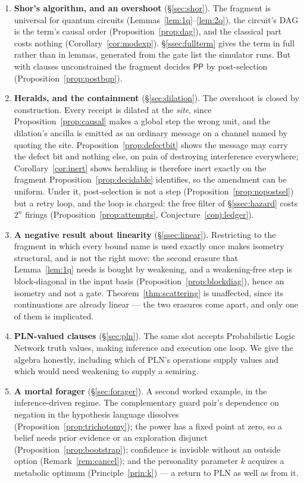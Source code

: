 \documentclass[11pt,a4paper]{article}
\theoremstyle{plain}
\theoremstyle{definition}
\theoremstyle{remark}
\begin{document}
\begin{enumerate}[leftmargin=1.4em,itemsep=3pt]
\item \textbf{Shor's algorithm, and an overshoot} (\S\ref{sec:shor}). The
fragment is universal for quantum circuits (Lemmas~\ref{lem:1q}--\ref{lem:2q}),
the circuit's DAG is the term's causal order (Proposition~\ref{prop:dag}), and
the classical part costs nothing (Corollary~\ref{cor:modexp}). \S\ref{ssec:fullterm}
gives the term in full rather than in lemmas, generated from the gate list the
simulator runs. But with clauses
unconstrained the fragment decides $\mathsf{PP}$ by post-selection
(Proposition~\ref{prop:postbqp}).

\item \textbf{Heralds, and the containment} (\S\ref{sec:dilation}). The
overshoot is closed by construction. Every receipt is dilated at the \emph{site},
since Proposition~\ref{prop:causal} makes a global step the wrong unit, and the
dilation's ancilla is emitted as an ordinary message on a channel named by
quoting the site. Proposition~\ref{prop:defectbit} shows the message may carry
the defect bit and nothing else, on pain of destroying interference everywhere;
Corollary~\ref{cor:inert} shows heralding is therefore inert exactly on the
fragment Proposition~\ref{prop:decidable} identifies, so the amendment can be
uniform. Under it, post-selection is not a step
(Proposition~\ref{prop:nopostsel}) but a retry loop, and the loop is charged:
the free filter of \S\ref{ssec:hazard} costs $2^n$ firings
(Proposition~\ref{prop:attempts}, Conjecture~\ref{conj:ledger}).

\item \textbf{A negative result about linearity} (\S\ref{ssec:linear}).
Restricting to the fragment in which every bound name is used exactly once makes
isometry structural, and is not the right move: the second erasure that
Lemma~\ref{lem:1q} needs is bought by weakening, and a weakening-free step is
block-diagonal in the input basis (Proposition~\ref{prop:blockdiag}), hence an
isometry and not a gate. Theorem~\ref{thm:scattering} is unaffected, since its
continuations are already linear --- the two erasures come apart, and only one
of them is implicated.

\item \textbf{PLN-valued clauses} (\S\ref{sec:pln}). The same slot accepts
Probabilistic Logic Network truth values, making inference and execution one
loop. We give the algebra honestly, including which of PLN's operations supply
values and which would need weakening to supply a semiring.

\item \textbf{A mortal forager} (\S\ref{sec:forager}). A second worked example,
in the inference-driven regime. The complementary guard pair's dependence on
negation in the hypothesis language dissolves
(Proposition~\ref{prop:trichotomy}); the power has a fixed point at zero, so a
belief needs prior evidence or an exploration disjunct
(Proposition~\ref{prop:bootstrap}); confidence is invisible without an outside
option (Remark~\ref{rem:cancel}); and the personality parameter $k$ acquires a
metabolic optimum (Principle~\ref{prin:k}) --- a return to PLN as well as from it.
\end{enumerate}
\end{document}
